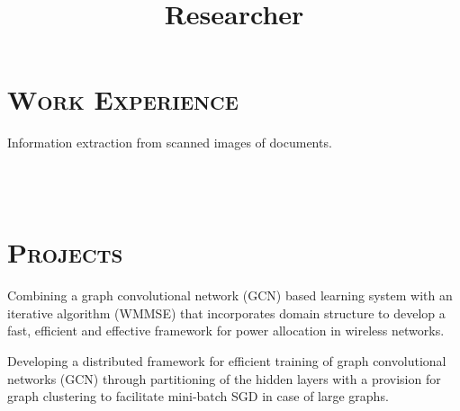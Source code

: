 \begin{resume}
\section{\textsc{Work Experience}}

\title{Researcher}
\begin{position}
Information extraction from scanned images of documents. 
\end{position}





\begin{formatb}
  \\
  \body\\
\end{formatb}

\section{\textsc{Projects}}

\begin{position}
Combining a graph convolutional network (GCN) based learning system with an iterative algorithm (WMMSE) that incorporates domain structure to develop a fast, efficient and effective framework for power allocation in wireless networks.
\end{position}

\begin{position}
Developing a distributed framework for efficient training of graph convolutional networks (GCN) through partitioning of the hidden layers with a provision for graph clustering to facilitate mini-batch SGD in case of large graphs.
\end{position}



\end{resume}
